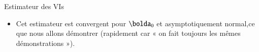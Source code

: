 \begin{frame}[allowframebreaks]{Estimateur des VIs}
\begin{itemize}
\begin{align*}
    \hat{\bolda}_N^{MM} &= \left[N^{-1}\sumiN \boldz_i\boldx_i^\prime \right]^{-1}N^{-1}\sumiN \boldz_iy_i \equiv\hat{\bolda}_N^{VI},
\end{align*}
qui définit ce qu’on appelle l’estimateur des VI.

\framebreak

\begin{definition_fr}
    Dans le modèle à variables instrumentales de la définition \ref{def3}, soit:
    \begin{align*}
        y_i&=\boldx_i^\prime \bolda_0 + u_i \ \text{avec} \ \Exp[u_i| \boldz_i]=\Exp[u]\equiv0, 
        \ \text{et} \ \Rang\left(\Exp[\boldz_i\boldx_i^\prime]\right)= K = \dim(\boldx_i),
    \end{align*}
    l’estimateur des variables instrumentales(VIs) de $\bolda_0$ est défini par:
    \begin{align*}
        \hat{\bolda}_N^{VI}&\equiv \left[N^{-1}\sumiN \boldz_i\boldx_i^\prime \right]^{-1}N^{-1}\sumiN \boldz_iy_i.
    \end{align*}
    \label{def4}
\end{definition_fr}
\item Cet estimateur est convergent pour $\bolda_0$ et asymptotiquement normal,ce que
nous allons démontrer (rapidement car « on fait toujours les mêmes démonstrations »).
\end{itemize}
\end{frame}

